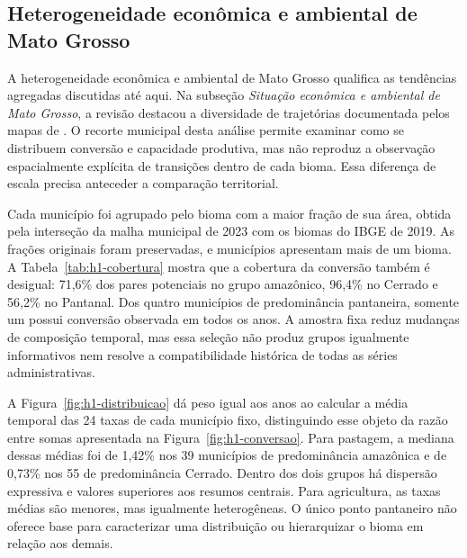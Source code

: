 \FloatBarrier
\subsection{Heterogeneidade econômica e ambiental de Mato Grosso}
\label{subsec:mt-heterogeneidade}

A heterogeneidade econômica e ambiental de Mato Grosso qualifica as tendências agregadas discutidas até aqui. Na subseção \emph{Situação econômica e ambiental de Mato Grosso}, a revisão destacou a diversidade de trajetórias documentada pelos mapas de . O recorte municipal desta análise permite examinar como se distribuem conversão e capacidade produtiva, mas não reproduz a observação espacialmente explícita de transições dentro de cada bioma. Essa diferença de escala precisa anteceder a comparação territorial.

Cada município foi agrupado pelo bioma com a maior fração de sua área, obtida pela interseção da malha municipal de 2023 com os biomas do IBGE de 2019. As frações originais foram preservadas, e \Hmixed{} municípios apresentam mais de um bioma. A Tabela~\ref{tab:h1-cobertura} mostra que a cobertura da conversão também é desigual: 71,6\% dos pares potenciais no grupo amazônico, 96,4\% no Cerrado e 56,2\% no Pantanal. Dos quatro municípios de predominância pantaneira, somente um possui conversão observada em todos os anos. A amostra fixa reduz mudanças de composição temporal, mas essa seleção não produz grupos igualmente informativos nem resolve a compatibilidade histórica de todas as séries administrativas.



A Figura~\ref{fig:h1-distribuicao} dá peso igual aos anos ao calcular a média temporal das 24 taxas de cada município fixo, distinguindo esse objeto da razão entre somas apresentada na Figura~\ref{fig:h1-conversao}. Para pastagem, a mediana dessas médias foi de 1,42\% nos 39 municípios de predominância amazônica e de 0,73\% nos 55 de predominância Cerrado. Dentro dos dois grupos há dispersão expressiva e valores superiores aos resumos centrais. Para agricultura, as taxas médias são menores, mas igualmente heterogêneas. O único ponto pantaneiro não oferece base para caracterizar uma distribuição ou hierarquizar o bioma em relação aos demais.

